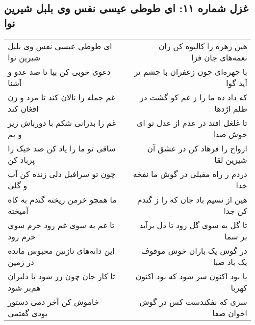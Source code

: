 \begin{center}
\section*{غزل شماره ۱۱: ای طوطی عیسی نفس وی بلبل شیرین نوا}
\label{sec:0011}
\begin{longtable}{l p{0.5cm} r}
ای طوطی عیسی نفس وی بلبل شیرین نوا
&&
هین زهره را کالیوه کن زان نغمه‌های جان فزا
\\
دعوی خوبی کن بیا تا صد عدو و آشنا
&&
با چهره‌ای چون زعفران با چشم تر آید گوا
\\
غم جمله را نالان کند تا مرد و زن افغان کند
&&
که داد ده ما را ز غم کو گشت در ظلم اژدها
\\
غم را بدرانی شکم با دورباش زیر و بم
&&
تا غلغل افتد در عدم از عدل تو ای خوش صدا
\\
ساقی تو ما را یاد کن صد خیک را پرباد کن
&&
ارواح را فرهاد کن در عشق آن شیرین لقا
\\
چون تو سرافیل دلی زنده کن آب و گلی
&&
دردم ز راه مقبلی در گوش ما نفخه خدا
\\
ما همچو خرمن ریخته گندم به کاه آمیخته
&&
هین از نسیم باد جان که را ز گندم کن جدا
\\
تا غم به سوی غم رود خرم سوی خرم رود
&&
تا گل به سوی گل رود تا دل برآید بر سما
\\
این دانه‌های نازنین محبوس مانده در زمین
&&
در گوش یک باران خوش موقوف یک باد صبا
\\
تا کار جان چون زر شود با دلبران هم‌بر شود
&&
پا بود اکنون سر شود که بود اکنون کهربا
\\
خاموش کن آخر دمی دستور بودی گفتمی
&&
سری که نفکندست کس در گوش اخوان صفا
\\
\end{longtable}
\end{center}
